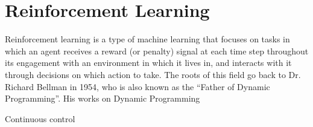 \newpage\section{Reinforcement Learning}\label{sec:reinforcement_learning}

Reinforcement learning is a type of machine learning that focuses on tasks in which an agent receives a reward (or penalty) signal at each time step throughout its engagement with an environment in which it lives in, and interacts with it through decisions on which action to take. The roots of this field go back to Dr. Richard Bellman in 1954, who is also known as the ``Father of Dynamic Programming''. His works on Dynamic Programming \cite{Bellman1954,Bellman1957a}

Continuous control \cite{Recht2019}



